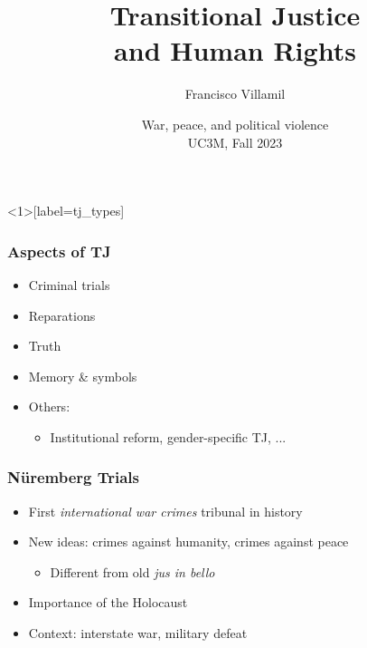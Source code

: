 \documentclass[aspectratio=43]{beamer}
\title{\huge Transitional Justice\\and Human Rights}
\author{Francisco Villamil}
\date{War, peace, and political violence\\UC3M, Fall 2023}
\begin{document}
\begin{frame}
  \titlepage
\end{frame}


\begin{frame}<1>[label=tj_types]
\frametitle{Aspects of TJ}
\centering

\begin{itemize}
  \item Criminal trials
  \item<2-> Reparations
  \item<3-> Truth
  \item<4-> Memory \& symbols
  \item<5-> Others:
  \begin{itemize}
    \item Institutional reform, gender-specific TJ, ...
  \end{itemize}
\end{itemize}

\end{frame}


\begin{frame}
\frametitle{Nüremberg Trials}
\centering

\begin{itemize}
  \item First \textit{international war crimes} tribunal in history
  \item<2-> New ideas: crimes against humanity, crimes against peace
  \begin{itemize}
    \item Different from old \textit{jus in bello}
  \end{itemize}
  \item<3-> Importance of the Holocaust
  \item<4-> Context: interstate war, military defeat
\end{itemize}

\end{frame}
\end{document}
